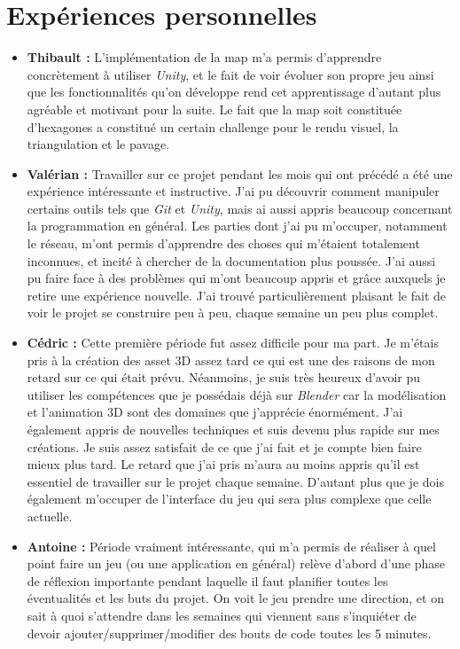 \documentclass[12pt]{report}
\begin{document}
\chapter{Expériences personnelles}

\begin{itemize}
	\item \textbf{Thibault :} L’implémentation de la map m’a permis d’apprendre concrètement à utiliser \textit{Unity}, et le fait de voir évoluer son propre jeu ainsi que les fonctionnalités qu’on développe rend cet apprentissage d’autant plus agréable et motivant pour la suite. Le fait que la map soit constituée d’hexagones a constitué un certain challenge pour le rendu visuel, la triangulation et le pavage.
    \item \textbf{Valérian :} Travailler sur ce projet pendant les mois qui ont précédé a été une expérience intéressante et instructive. J’ai pu découvrir comment manipuler certains outils tels que \textit{Git} et \textit{Unity}, mais ai aussi appris beaucoup concernant la programmation en général. Les parties dont j’ai pu m’occuper, notamment le réseau, m’ont permis d’apprendre des choses qui m'étaient totalement inconnues, et incité à chercher de la documentation plus poussée. J’ai aussi pu faire face à des problèmes qui m’ont beaucoup appris et grâce auxquels je retire une expérience nouvelle. J’ai trouvé particulièrement plaisant le fait de voir le projet se construire peu à peu, chaque semaine un peu plus complet.
	\item \textbf{Cédric :} Cette première période fut assez difficile pour ma part. Je m’étais pris à la création des asset 3D assez tard ce qui est une des raisons de mon retard sur ce qui était prévu. Néanmoins, je suis très heureux d’avoir pu utiliser les compétences que je possédais déjà sur \textit{Blender} car la modélisation et l’animation 3D sont des domaines que j’apprécie énormément. J’ai également appris de nouvelles techniques et suis devenu plus rapide sur mes créations. Je suis assez satisfait de ce que j’ai fait et je compte bien faire mieux plus tard. Le retard que j’ai pris m’aura au moins appris qu’il est essentiel de travailler sur le projet chaque semaine. D’autant plus que je dois également m’occuper de l’interface du jeu qui sera plus complexe que celle actuelle.
	\item \textbf{Antoine :} Période vraiment intéressante, qui m’a permis de réaliser à quel point faire un jeu (ou une application en général) relève d’abord d’une phase de réflexion importante pendant laquelle il faut planifier toutes les éventualités et les buts du projet. On voit le jeu prendre une direction, et on sait à quoi s’attendre dans les semaines qui viennent sans s’inquiéter de devoir ajouter/supprimer/modifier des bouts de code toutes les 5 minutes.
\end{itemize}
\end{document}
